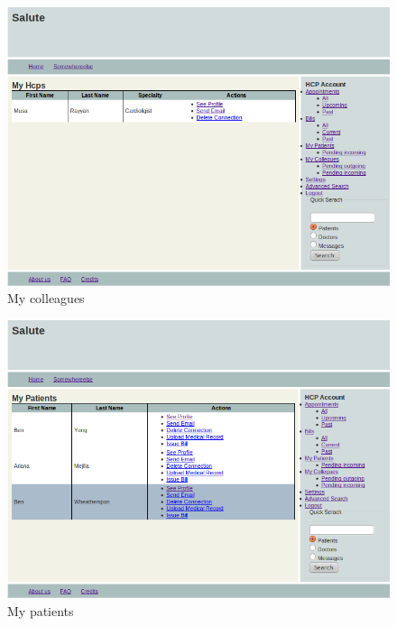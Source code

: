 \begin{figure}
\includegraphics[scale=0.6]{screenshots/my_colleagues.png}
\caption{My colleagues}
\end{figure}

\begin{figure}
\includegraphics[scale=0.6]{screenshots/my_patients.png}
\caption{My patients}
\end{figure}

